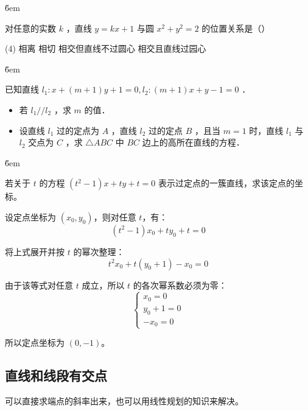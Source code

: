 \v{6em}

\begin{example}
    对任意的实数 $k$ ，直线 $y=k x+1$ 与圆 $x^2+y^2=2$ 的位置关系是（\qquad）
    \begin{tasks}(4)
        \task 相离
        \task 相切
        \task 相交但直线不过圆心
        \task 相交且直线过园心
    \end{tasks}
\end{example}

\v{6em}

\begin{example}
    已知直线 $l_1: x+(m+1) y+1=0, l_2:(m+1) x+y-1=0$ ．
    \begin{itemize}
        \item 若 $l_1 / / l_2$ ，求 $m$ 的值．
        \item 设直线 $l_1$ 过的定点为 $A$ ，直线 $l_2$ 过的定点 $B$ ，且当 $m=1$ 时，直线 $l_1$ 与 $l_2$ 交点为 $C$ ，求 $\triangle A B C$ 中 $B C$ 边上的高所在直线的方程．
    \end{itemize}
\end{example}

\v{6em}

\begin{example}
    若关于 $t$ 的方程 $(t^2-1)x+ty+t=0$ 表示过定点的一簇直线，求该定点的坐标。
\end{example}

\begin{solution}
    设定点坐标为 $(x_0,y_0)$，则对任意 $t$，有：
    \[
        (t^2-1)x_0+ty_0+t=0
    \]

    将上式展开并按 $t$ 的幂次整理：
    \[
        t^2x_0+t(y_0+1)-x_0=0
    \]

    由于该等式对任意 $t$ 成立，所以 $t$ 的各次幂系数必须为零：
    \[
        \begin{cases}
            x_0=0   \\
            y_0+1=0 \\
            -x_0=0
        \end{cases}
    \]

    所以定点坐标为 $(0,-1)$。
\end{solution}

\subsection{直线和线段有交点}

\begin{theorem}
    可以直接求端点的斜率出来，也可以用线性规划的知识来解决。
\end{theorem}

